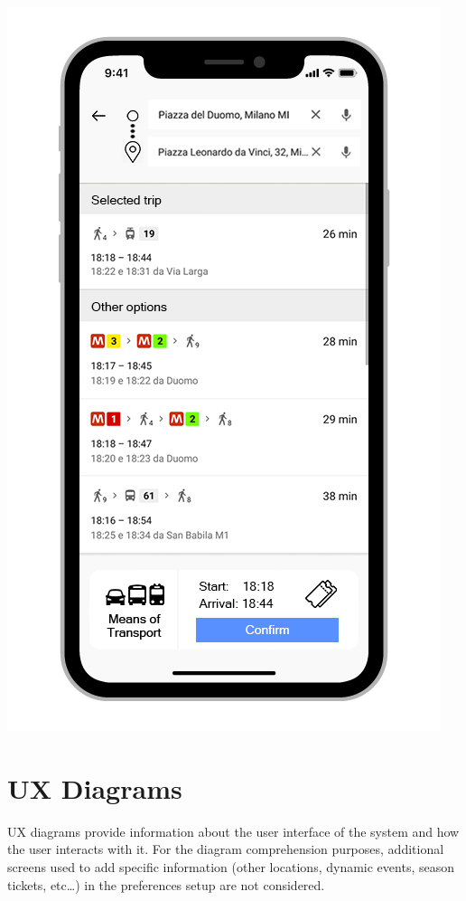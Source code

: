 \begin{center}
\includegraphics[scale=2.4]{MainMatter/images/ui/customized}

\end{center}
%
%
%
%
\section{UX Diagrams}
UX diagrams provide information about the user interface of the system and how the user interacts with it.
For the diagram comprehension purposes, additional screens used to add specific information (other locations, dynamic events, season tickets, etc…) in the preferences setup are not considered.

